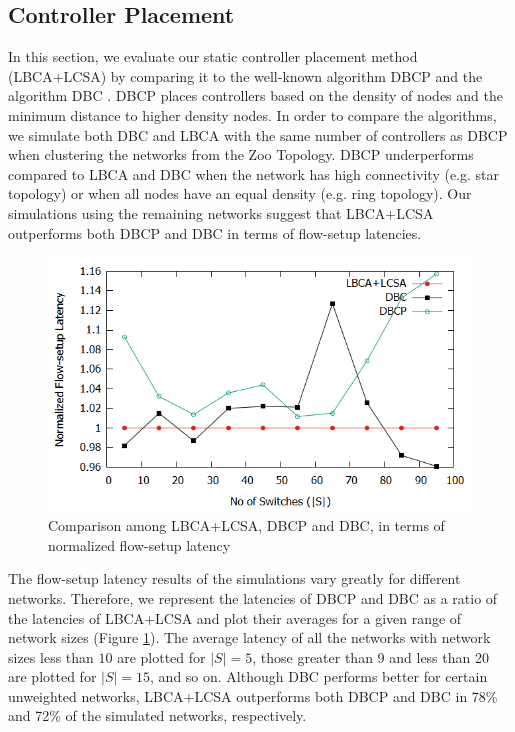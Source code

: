 \documentclass[a4paper,fleqn]{cas-dc}
\begin{document}
\subsection{Controller Placement} \label{CPAnalysis}

\noindent In this section, we evaluate our static controller placement method (LBCA+LCSA) by comparing it to the well-known algorithm DBCP \cite{dbcp2017} and the algorithm DBC \cite{aziz2019degree}. DBCP places controllers based on the density of nodes and the minimum distance to higher density nodes. In order to compare the algorithms, we simulate both DBC and LBCA with the same number of controllers as DBCP when clustering the networks from the Zoo Topology. DBCP underperforms compared to LBCA and DBC when the network has high connectivity (e.g. star topology) or when all nodes have an equal density (e.g. ring topology). Our simulations using the remaining networks suggest that LBCA+LCSA outperforms both DBCP and DBC in terms of flow-setup latencies.

\begin{figure}
	\centering
	\includegraphics[width=\linewidth]{Images/edited_forced_comparison.png}
	\caption{Comparison among LBCA+LCSA, DBCP and DBC, in terms of normalized flow-setup latency} \label{fig:Fcomparison}
\end{figure}

The flow-setup latency results of the simulations vary greatly for different networks. Therefore, we represent the latencies of DBCP and DBC as a ratio of the latencies of LBCA+LCSA and plot their averages for a given range of network sizes (Figure \ref{fig:Fcomparison}). The average latency of all the networks with network sizes less than $10$ are plotted for $|S|=5$, those greater than 9 and less than 20 are plotted for $|S|=15$, and so on. Although DBC performs better for certain unweighted networks, LBCA+LCSA outperforms both DBCP and DBC in 78\% and 72\% of the simulated networks, respectively.
\end{document}
